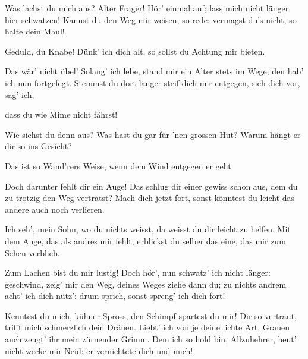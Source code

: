 \begin{drama}
\Siegfriedspeaks


Was lachst du mich aus?
Alter Frager!
Hör' einmal auf;
lass mich nicht länger hier schwatzen!
Kannst du den Weg
mir weisen, so rede:
vermagst du's nicht,
so halte dein Maul!

\Wandererspeaks

Geduld, du Knabe!
Dünk' ich dich alt,
so sollst du Achtung mir bieten.

\Siegfriedspeaks

Das wär' nicht übel!
Solang' ich lebe,
stand mir ein Alter
stets im Wege;
den hab' ich nun fortgefegt.
Stemmst du dort länger
steif dich mir entgegen,
sieh dich vor, sag' ich,


dass du wie Mime nicht fährst!


Wie siehst du denn aus?
Was hast du gar
für 'nen grossen Hut?
Warum hängt er dir so ins Gesicht?

\Wandererspeaks


Das ist so Wand'rers Weise,
wenn dem Wind entgegen er geht.

\Siegfriedspeaks


Doch darunter fehlt dir ein Auge!
Das schlug dir einer
gewiss schon aus,
dem du zu trotzig
den Weg vertratst?
Mach dich jetzt fort,
sonst könntest du leicht
das andere auch noch verlieren.

\Wandererspeaks

Ich seh', mein Sohn,
wo du nichts weisst,
da weisst du dir leicht zu helfen.
Mit dem Auge,
das als andres mir fehlt,
erblickst du selber das eine,
das mir zum Sehen verblieb.

\Siegfriedspeaks


Zum Lachen bist du mir lustig!
Doch hör', nun schwatz' ich nicht länger:
geschwind, zeig' mir den Weg,
deines Weges ziehe dann du;
zu nichts andrem
acht' ich dich nütz':
drum sprich, sonst spreng' ich dich fort!

\Wandererspeaks


Kenntest du mich,
kühner Spross,
den Schimpf spartest du mir!
Dir so vertraut,
trifft mich schmerzlich dein Dräuen.
Liebt' ich von je
deine lichte Art,
Grauen auch zeugt' ihr
mein zürnender Grimm.
Dem ich so hold bin,
Allzuhehrer,
heut' nicht wecke mir Neid:
er vernichtete dich und mich!


\end{drama}
